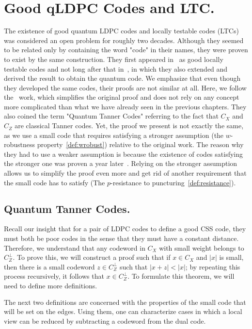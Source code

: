 \chapter{Good qLDPC Codes and LTC.}
The existence of good quantum LDPC codes and locally testable codes (LTCs) was considered an open problem for roughly two decades. Although they seemed to be related only by containing the word "code" in their names, they were proven to exist by the same construction. They first appeared in~\cite{Dinur} as good locally testable codes and not long after that in~\cite{Pavel}, in which they also extended and derived the result to obtain the quantum code. We emphasize that even though they developed the same codes, their proofs are not similar at all. Here, we follow the~\cite{leverrier2022quantum} work, which simplifies the original proof and does not rely on any concept more complicated than what we have already seen in the previous chapters. They also coined the term "Quantum Tanner Codes" referring to the fact that $C_{X}$ and $C_{Z}$ are classical Tanner codes. Yet, the proof we present is not exactly the same, as we use a small code that requires satisfying a stronger assumption (the $w$-robustness property~\ref{def:wrobust}) relative to the original work. The reason why they had to use a weaker assumption is because the existence of codes satisfying the stronger one was proven a year later~\cite{kalachev2022twosided}. Relying on the stronger assumption allows us to simplify the proof even more and get rid of another requirement that the small code has to satisfy (The $p$-resistance to puncturing~\ref{def:resistance}).

\section{Quantum Tanner Codes.}
Recall our insight that for a pair of LDPC codes to define a good CSS code, they must both be poor codes in the sense that they must have a constant distance. Therefore, we understand that any codeword in $C_{X}$ with small weight belongs to $C_{Z}^\perp$. To prove this, we will construct a proof such that if $x \in C_{X}$ and $|x|$ is small, then there is a small codeword $z \in C_{Z}^{\perp}$ such that $|x+z| < |x|$; by repeating this process recursively, it follows that $x\in C_{Z}^{\perp}$. To formulate this theorem, we will need to define more definitions.
  
 The next two definitions are concerned with the properties of the small code that will be set on the edges. Using them, one can characterize cases in which a local view can be reduced by subtracting a codeword from the dual code. 

